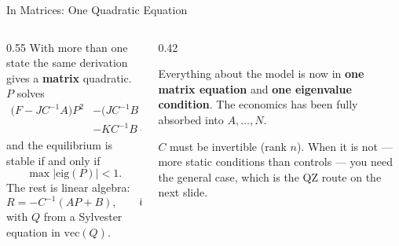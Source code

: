 \begin{frame}{In Matrices: One Quadratic Equation}
\begin{columns}[T]
\begin{column}{0.55\textwidth}
\small
With more than one state the same derivation gives a \textbf{matrix} quadratic. $P$ solves
\begin{align*}
  \big(F-JC^{-1}A\big)P^{2}
  &-\big(JC^{-1}B-G+KC^{-1}A\big)P\\
  &-KC^{-1}B+H \;=\; 0 ,
\end{align*}
and the equilibrium is stable if and only if
\[
  \max\big|\mathrm{eig}(P)\big| < 1 .
\]
The rest is linear algebra:
\[
  R=-C^{-1}(AP+B), \qquad U=-C^{-1}(AQ+D),
\]
with $Q$ from a Sylvester equation in $\mathrm{vec}(Q)$.
\end{column}
\begin{column}{0.42\textwidth}
\begin{takeawaybox}\footnotesize
Everything about the model is now in \textbf{one matrix equation} and \textbf{one eigenvalue condition}. The economics has been fully absorbed into $A,\dots,N$.
\end{takeawaybox}
\medskip
\begin{cautionbox}\footnotesize
$C$ must be invertible (rank $n$). When it is not --- more static conditions than controls --- you need the general case, which is the QZ route on the next slide.
\end{cautionbox}
\end{column}
\end{columns}
\vspace{1mm}
\end{frame}

